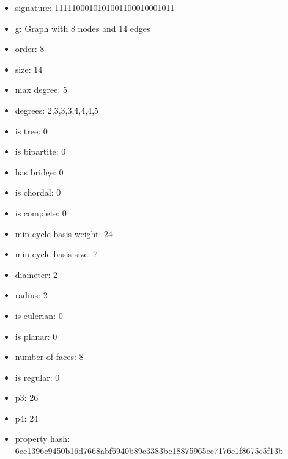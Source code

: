 \begin{itemize}
\item signature: 1111100010101001100010001011
\item g: Graph with 8 nodes and 14 edges
\item order: 8
\item size: 14
\item max degree: 5
\item degrees: 2,3,3,3,4,4,4,5
\item is tree: 0
\item is bipartite: 0
\item has bridge: 0
\item is chordal: 0
\item is complete: 0
\item min cycle basis weight: 24
\item min cycle basis size: 7
\item diameter: 2
\item radius: 2
\item is eulerian: 0
\item is planar: 0
\item number of faces: 8
\item is regular: 0
\item p3: 26
\item p4: 24
\item property hash: 6ec1396c9450b16d7668abf6940b89c3383bc18875965ee7176e1f8675c5f13b
\end{itemize}
\newpage
\begin{figure}
\end{figure}
